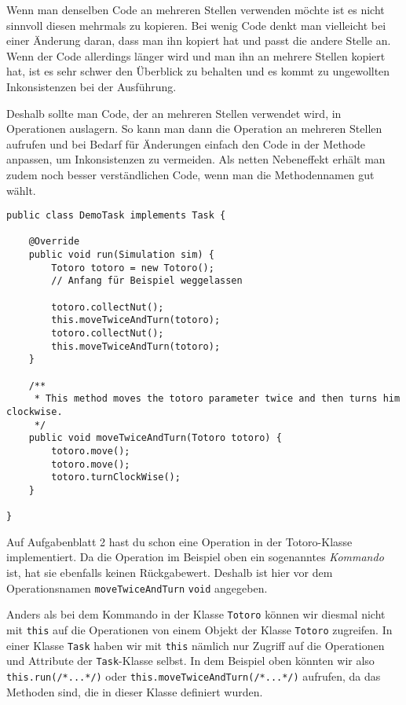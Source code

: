 \begin{Infobox}
	Wenn man denselben Code an mehreren Stellen verwenden möchte ist es nicht sinnvoll diesen mehrmals zu kopieren.
Bei wenig Code denkt man vielleicht bei einer Änderung daran, dass man ihn kopiert hat und passt die andere Stelle an.
Wenn der Code allerdings länger wird und man ihn an mehrere Stellen kopiert hat, ist es sehr schwer den Überblick zu behalten und es kommt zu ungewollten Inkonsistenzen bei der Ausführung.\newline

Deshalb sollte man Code, der an mehreren Stellen verwendet wird, in Operationen auslagern.
So kann man dann die Operation an mehreren Stellen aufrufen und bei Bedarf für Änderungen einfach den Code in der Methode anpassen, um Inkonsistenzen zu vermeiden.
Als netten Nebeneffekt erhält man zudem noch besser verständlichen Code, wenn man die Methodennamen gut wählt.

	\begin{lstlisting}[xleftmargin=0.5cm]
public class DemoTask implements Task {

    @Override
    public void run(Simulation sim) {
        Totoro totoro = new Totoro();
        // Anfang für Beispiel weggelassen

        totoro.collectNut();
        this.moveTwiceAndTurn(totoro);
        totoro.collectNut();
        this.moveTwiceAndTurn(totoro);
    }

    /**
	 * This method moves the totoro parameter twice and then turns him clockwise.
	 */
    public void moveTwiceAndTurn(Totoro totoro) {
        totoro.move();
        totoro.move();
        totoro.turnClockWise();
    }

}
	\end{lstlisting}

	Auf Aufgabenblatt 2 hast du schon eine Operation in der Totoro-Klasse implementiert.
Da die Operation im Beispiel oben ein sogenanntes \textit{Kommando} ist, hat sie ebenfalls keinen Rückgabewert.
Deshalb ist hier vor dem Operationsnamen \lstinline{moveTwiceAndTurn} \lstinline{void} angegeben.\newline

Anders als bei dem Kommando in der Klasse \lstinline{Totoro} können wir diesmal nicht mit \lstinline{this} auf die Operationen von einem Objekt der Klasse \lstinline{Totoro} zugreifen.
In einer Klasse \lstinline{Task} haben wir mit \lstinline{this} nämlich nur Zugriff auf die Operationen und Attribute der \lstinline{Task}-Klasse selbst.
In dem Beispiel oben könnten wir also \lstinline{this.run(/*...*/)} oder \lstinline{this.moveTwiceAndTurn(/*...*/)} aufrufen, da das Methoden sind, die in dieser Klasse definiert wurden.\newline


\end{Infobox}
